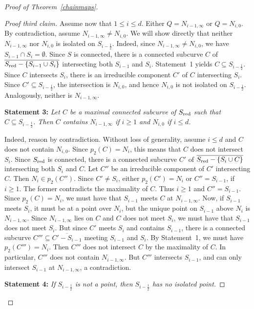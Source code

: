 \documentclass[10pt,a4paper]{amsart}
\def\red{\text{\rm red}}
\begin{document}
\begin{proof}[Proof of Theorem~\ref{chainmaps}]
\begin{proof}[Proof third claim]
Assume now that $1\leq i\leq d$. Either $Q=N_{i-1,\infty}$ or $Q=N_{i,0}$. By contradiction, assume $N_{i-1,\infty}\neq N_{i,0}$. We will show directly that neither $N_{i-1,\infty}$ nor $N_{i,0}$ is isolated on $S_{i-\frac{1}{2}}$. Indeed, since $N_{i-1,\infty}\neq N_{i,0}$, we have $S_{i-1}\cap S_i=\emptyset$. Since $S$ is connected, there is a connected subcurve $C$ of $\overline{S_\red-\{S_{i-1}\cup S_i\}}$ intersecting both $S_{i-1}$ and $S_i$. Statement~1 yields $C\subseteq S_{i-\frac{1}{2}}$. Since $C$ intersects $S_i$, there is an irreducible component $C'$ of $C$ intersecting $S_i$. Since $C'\subseteq S_{i-\frac{1}{2}}$, the intersection is $N_{i,0}$, and hence $N_{i,0}$ is not isolated on $S_{i-\frac{1}{2}}$. Analogously, neither is $N_{i-1,\infty}$. 

\vskip0.1cm

{\bf Statement 3:} {\it Let $C$ be a maximal connected subcurve of $S_\red$ such that $C\subseteq S_{i-\frac{1}{2}}$. Then $C$ contains 
$N_{i-1,\infty}$ if $i\geq 1$ and $N_{i,0}$ if $i\leq d$.}

Indeed, reason by contradiction. Without loss of generality, assume $i\leq d$ and $C$ does not contain $N_{i,0}$. Since $p_2(C)=N_i$, this means that $C$ does not intersect $S_i$. Since $S_\red$ is connected, there is a connected subcurve $C'$ of $\overline{S_\red-\{S_i\cup C\}}$ intersecting both $S_i$ and $C$. Let $C''$ be an irreducible component of $C'$ intersecting $C$. Then $N_i\in p_2(C'')$. Since $C'\neq S_i$, either $p_2(C' )=N_i$ or $C''=S_{i-1}$, if $i\geq 1$. The former contradicts the maximality of $C$. Thus $i\geq 1$ and $C''=S_{i-1}$. Since $p_2(C)=N_i$, we must have that $S_{i-1}$ meets $C$ at $N_{i-1,\infty}$. Now, if $S_{i-1}$  meets $S_i$, it must be at a point over $N_i$, but the unique point on $S_{i-1}$ above $N_i$ is $N_{i-1,\infty}$. Since $N_{i-1,\infty}$ lies on $C$ and $C$ does not meet $S_i$, we must have that $S_{i-1}$ does not meet $S_i$. But since $C'$ meets $S_i$ and contains $S_{i-1}$, there is a connected subcurve $C'''\subseteq\overline{C'-S_{i-1}}$ meeting $S_{i-1}$ and $S_i$. By Statement~1, we must have $p_2(C''')=N_i$. Then $C'''$ does not intersect $C$ by the maximality of $C$. In particular, $C'''$ does not contain $N_{i-1,\infty}$. But $C'''$ intersects $S_{i-1}$, and can only intersect $S_{i-1}$ at $N_{i-1,\infty}$, a contradiction.

\vskip0.1cm

{\bf Statement 4:} {\it If $S_{i-\frac{1}{2}}$ is not a point, then 
$S_{i-\frac{1}{2}}$ has no isolated point.} 


\end{proof}
\end{proof}
\end{document}
